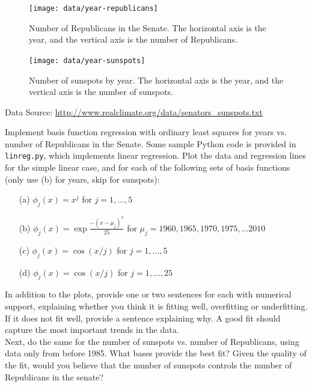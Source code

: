 \documentclass[submit]{harvardml}
\begin{document}
\begin{figure}[h]
\centering
\texttt{[image: data/year-republicans]}
\caption{Number of Republicans in the Senate.  The horizontal axis is the year, and the vertical axis is the number of Republicans.}
\label{fig:congress}
\end{figure}

\begin{figure}[h]
\centering
\texttt{[image: data/year-sunspots]}
\caption{Number of sunspots by year.  The horizontal axis is the year, and the vertical axis is the number of sunspots.}
\label{fig:sunspots}
\end{figure}

Data Source: \url{http://www.realclimate.org/data/senators_sunspots.txt}

\begin{problem} 

Implement basis function regression with ordinary least squares for
years vs. number of Republicans in the Senate. Some sample Python code
is provided in \verb|linreg.py|, which implements linear regression.
Plot the data and regression lines for the simple linear case, and for
each of the following sets of basis functions (only use (b) for years, skip for sunspots):
\begin{itemize}
	\item[(a)] $\phi_j(x) = x^j$ for $j=1, \ldots, 5$ 
    \item[(b)] $\phi_j(x) = \exp{\frac{-(x-\mu_j)^2}{25}}$ for $\mu_j=1960, 1965, 1970, 1975, \ldots 2010$
	\item[(c)] $\phi_j(x) = \cos(x / j)$ for $j=1, \ldots, 5$
	\item[(d)] $\phi_j(x) = \cos(x / j)$ for $j=1, \ldots, 25$
\end{itemize}
In addition to the plots, provide one or two sentences for each with
numerical support, explaining whether you think it is fitting well,
overfitting or underfitting.  If it does not fit well, provide a
sentence explaining why. A good fit should capture the most important
trends in the data.\\ 

\noindent Next, do the same for the number of sunspots vs. number of
Republicans, using data only from before 1985.  What bases provide the
best fit?  Given the quality of the fit, would you believe that the
number of sunspots controls the number of Republicans in the senate?

\end{problem}
\end{document}

